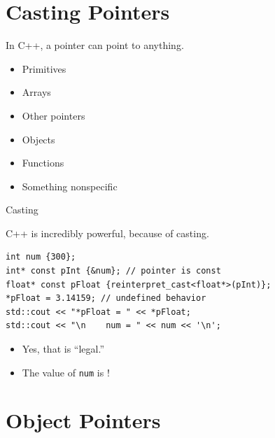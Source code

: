 \documentclass[14pt,aspectratio=1610]{beamer}
\begin{document}
\section{Casting Pointers}

\begin{frame}{In C++, a pointer can point to anything.}
  \begin{itemize}
  \item Primitives
  \item Arrays
  \item Other pointers
  \item Objects
  \item Functions
  \item Something nonspecific
  \end{itemize}
\end{frame}

\begin{frame}[fragile]{Casting}

C++ is incredibly powerful, because of casting.\\
\begin{lstlisting}
int num {300};
int* const pInt {&num}; // pointer is const
float* const pFloat {reinterpret_cast<float*>(pInt)};
*pFloat = 3.14159; // undefined behavior
std::cout << "*pFloat = " << *pFloat;
std::cout << "\n    num = " << num << '\n';
\end{lstlisting}

\begin{itemize}
\item
  Yes, that is ``legal.''
\item 
  The value of \lstinline{num} is \underline{}!
\end{itemize}
\end{frame}


\section{Object Pointers}
\end{document}
